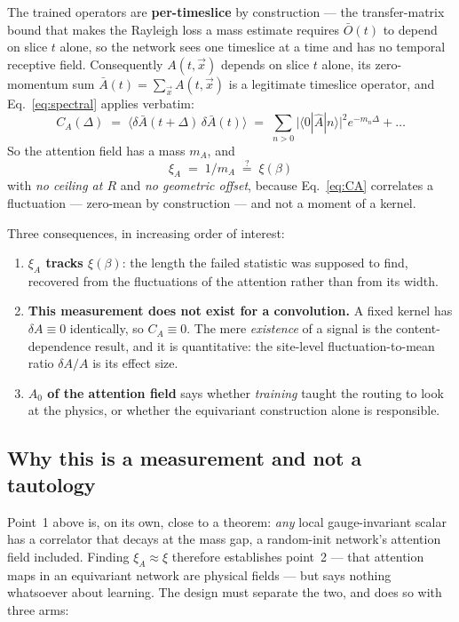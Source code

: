 \documentclass[11pt,a4paper]{article}
\newcommand{\Obar}{\bar{O}}
\newcommand{\Abar}{\bar{A}}
\newcommand{\xiA}{\xi_A}
\begin{document}
The trained operators are \textbf{per-timeslice} by construction --- the
transfer-matrix bound that makes the Rayleigh loss a mass estimate requires
$\Obar(t)$ to depend on slice $t$ alone, so the network sees one timeslice at a
time and has no temporal receptive field. Consequently $A(t,\vec{x})$ depends on
slice $t$ alone, its zero-momentum sum $\Abar(t) = \sum_{\vec x} A(t,\vec x)$ is
a legitimate timeslice operator, and Eq.~\eqref{eq:spectral} applies verbatim:
\begin{equation}
  C_A(\Delta)
  \;=\; \big\langle \delta\Abar(t+\Delta)\, \delta\Abar(t) \big\rangle
  \;=\; \sum_{n>0} \big|\langle 0|\hat{A}|n\rangle\big|^2 e^{-m_n\Delta} + \dots
  \label{eq:CA}
\end{equation}
So the attention field has a mass $m_A$, and
\begin{equation}
  \boxed{\ \xiA \;=\; 1/m_A \;\overset{?}{=}\; \xi(\beta)\ }
\end{equation}
with \emph{no ceiling at $R$} and \emph{no geometric offset}, because
Eq.~\eqref{eq:CA} correlates a fluctuation --- zero-mean by construction --- and
not a moment of a kernel.

Three consequences, in increasing order of interest:
\begin{enumerate}
  \item \textbf{$\xiA$ tracks $\xi(\beta)$}: the length the failed statistic was
        supposed to find, recovered from the fluctuations of the attention
        rather than from its width.
  \item \textbf{This measurement does not exist for a convolution.} A fixed
        kernel has $\delta A \equiv 0$ identically, so $C_A \equiv 0$. The mere
        \emph{existence} of a signal is the content-dependence result, and it is
        quantitative: the site-level fluctuation-to-mean ratio $\delta A/A$ is
        its effect size.
  \item \textbf{$A_0$ of the attention field} says whether \emph{training}
        taught the routing to look at the physics, or whether the equivariant
        construction alone is responsible.
\end{enumerate}

\subsection{Why this is a measurement and not a tautology}
\label{sec:tautology}

Point~1 above is, on its own, close to a theorem: \emph{any} local
gauge-invariant scalar has a correlator that decays at the mass gap, a
random-init network's attention field included. Finding $\xiA \approx \xi$
therefore establishes point~2 --- that attention maps in an equivariant network
are physical fields --- but says nothing whatsoever about learning. The design
must separate the two, and does so with three arms:
\end{document}
